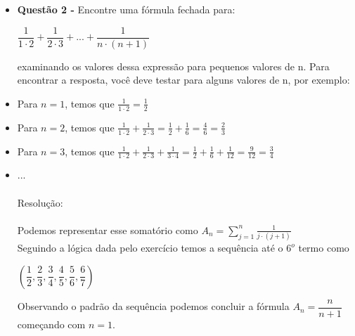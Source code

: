 \documentclass[a4paper,12pt]{article}
\begin{document}
\begin{itemize}
     \\\\ 
     \item [] \textbf{Questão 2 -} Encontre uma fórmula fechada para:
     \\
     
     \begin{centering}
     
     $\dfrac{1}{1\cdot 2} + \dfrac{1}{2\cdot 3} + ... + \dfrac{1}{n\cdot (n + 1)}$
     
     \end{centering}
     
     examinando os valores dessa expressão para pequenos valores de n.
     \newline
    Para encontrar a resposta, você deve testar para alguns valores de n, por exemplo:
    
    \item Para $n = 1$, temos que $\frac{1}{1\cdot 2} = \frac{1}{2}$
    \item Para $n = 2$, temos que $\frac{1}{1\cdot 2} + \frac{1}{2\cdot 3} = \frac{1}{2} + \frac{1}{6} = \frac{4}{6} = \frac{2}{3}$
    \item Para $n = 3$, temos que $\frac{1}{1\cdot 2} + \frac{1}{2\cdot 3} + \frac{1}{3\cdot 4} = \frac{1}{2} + \frac{1}{6} + \frac{1}{12} = \frac{9}{12} = \frac{3}{4}$
    \item ...
    \\\\Resolução:
    \\\\Podemos representar esse somatório como $A_n=\sum\limits_{j=1}^n \frac{1}{j\cdot (j+1)}$
    \\Seguindo a lógica dada pelo exercício temos a sequência até o $6^o$ termo como
    \begin{center}
    $\left(\dfrac{1}{2},\dfrac{2}{3},\dfrac{3}{4},\dfrac{4}{5},\dfrac{5}{6},\dfrac{6}{7}\right)$
    \end{center}
    Observando o padrão da sequência podemos concluir a fórmula $A_n=\dfrac{n}{n+1}$
    \\começando com $n=1$.
    
\end{itemize}
\end{document}
